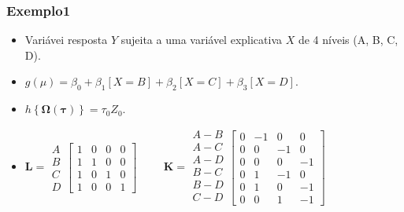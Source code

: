 \documentclass[10pt,
  aspectratio=169,
  serif,
  mathserif,
  professionalfont,
  compress,
  handout,
  ]{beamer}\usepackage[]{graphicx}\usepackage[]{color}
\begin{document}
\begin{frame}

\frametitle{Exemplo1}

\begin{itemize}
    \itemsep 2ex

  \item Variávei resposta $Y$ sujeita a uma variável explicativa $X$ de 4 níveis (A, B, C, D).

  \item $g(\mu) = \beta_0 + \beta_1[X=B] + \beta_2[X=C] + \beta_3[X=D]$.

  \item $h\left \{ \boldsymbol{\Omega}(\boldsymbol{\tau}) \right \} = \tau_{0}Z_0$.

  \item $
    \boldsymbol{L} = 
      \begin{matrix}
        A\\ 
        B\\ 
        C\\ 
        D 
      \end{matrix} 
    \begin{bmatrix}
      1 & 0 & 0 & 0\\ 
      1 & 1 & 0 & 0\\ 
      1 & 0 & 1 & 0\\ 
      1 & 0 & 0 & 1 
    \end{bmatrix}
    \hspace{1cm}
    \boldsymbol{K} = 
      \begin{matrix}
        A-B\\ 
        A-C\\ 
        A-D\\ 
        B-C\\
        B-D\\
        C-D\\ 
      \end{matrix} 
    \begin{bmatrix}
      0 & -1 &  0 &  0\\ 
      0 &  0 & -1 &  0\\ 
      0 &  0 &  0 & -1\\ 
      0 &  1 & -1 &  0\\ 
      0 &  1 &  0 & -1\\ 
      0 &  0 &  1 & -1 
    \end{bmatrix}
$
\end{itemize}

\end{frame}
\end{document}
